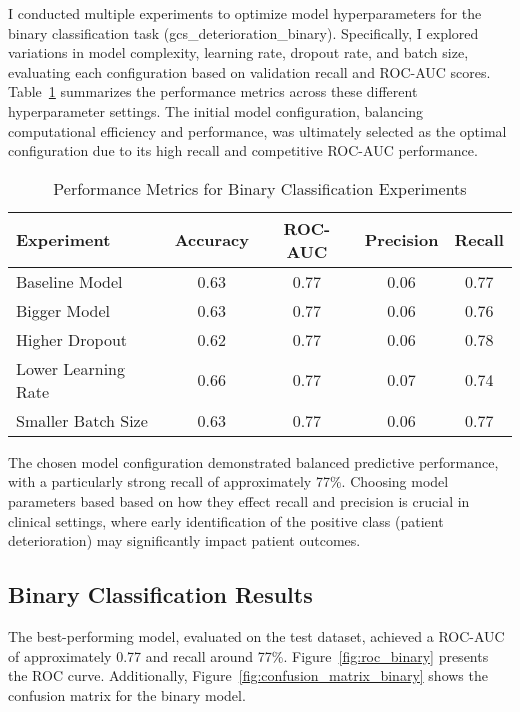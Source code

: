 \documentclass[conference]{IEEEtran}
\begin{document}
I conducted multiple experiments to optimize model hyperparameters for the binary classification task (gcs\_deterioration\_binary). Specifically, I explored variations in model complexity, learning rate, dropout rate, and batch size, evaluating each configuration based on validation recall and ROC-AUC scores. Table~\ref{tab:experiment_metrics} summarizes the performance metrics across these different hyperparameter settings. The initial model configuration, balancing computational efficiency and performance, was ultimately selected as the optimal configuration due to its high recall and competitive ROC-AUC performance.

\begin{table}[htbp]
\centering
\caption{Performance Metrics for Binary Classification Experiments}
\label{tab:experiment_metrics}
\begin{tabular}{lcccc}
\hline
\textbf{Experiment} & \textbf{Accuracy} & \textbf{ROC-AUC} & \textbf{Precision} & \textbf{Recall} \\
\hline
Baseline Model & 0.63 & 0.77 & 0.06 & 0.77 \\
Bigger Model & 0.63 & 0.77 & 0.06 & 0.76 \\
Higher Dropout & 0.62 & 0.77 & 0.06 & 0.78 \\
Lower Learning Rate & 0.66 & 0.77 & 0.07 & 0.74 \\
Smaller Batch Size & 0.63 & 0.77 & 0.06 & 0.77 \\
\hline
\end{tabular}
\end{table}

The chosen model configuration demonstrated balanced predictive performance, with a particularly strong recall of approximately 77\%. Choosing model parameters based based on how they effect recall and precision is crucial in clinical settings, where early identification of the positive class (patient deterioration) may significantly impact patient outcomes.

\subsection{Binary Classification Results}

The best-performing model, evaluated on the test dataset, achieved a ROC-AUC of approximately 0.77 and recall around 77\%. Figure~\ref{fig:roc_binary} presents the ROC curve. Additionally, Figure~\ref{fig:confusion_matrix_binary} shows the confusion matrix for the binary model.
\end{document}
